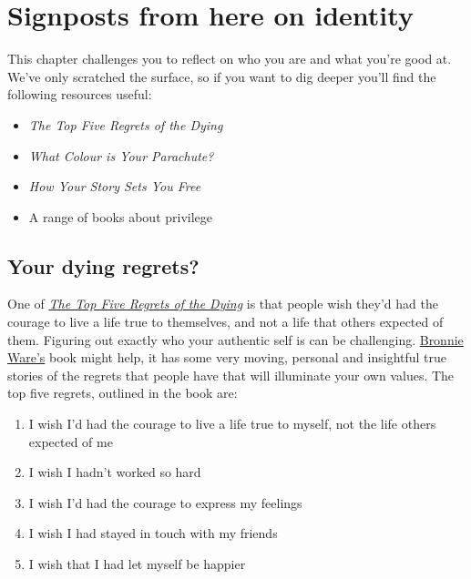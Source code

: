 \documentclass[
]{book}
\providecommand{\tightlist}{%
  \setlength{\itemsep}{0pt}\setlength{\parskip}{0pt}}
\begin{document}
\hypertarget{sign2}{%
\section{Signposts from here on identity}\label{sign2}}

This chapter challenges you to reflect on who you are and what you're good at. We've only scratched the surface, so if you want to dig deeper you'll find the following resources useful:

\begin{itemize}
\tightlist
\item
  \emph{The Top Five Regrets of the Dying}
\item
  \emph{What Colour is Your Parachute?}
\item
  \emph{How Your Story Sets You Free}
\item
  A range of books about privilege
\end{itemize}

\hypertarget{regret}{%
\subsection{Your dying regrets?}\label{regret}}

One of \emph{\href{https://en.wikipedia.org/wiki/The_Top_Five_Regrets_of_the_Dying}{The Top Five Regrets of the Dying}} \citep{regrets} is that people wish they'd had the courage to live a life true to themselves, and not a life that others expected of them. Figuring out exactly who your authentic self is can be challenging. \href{https://en.wikipedia.org/wiki/Bronnie_Ware}{Bronnie Ware's} book might help, it has some very moving, personal and insightful true stories of the regrets that people have that will illuminate your own values. The top five regrets, outlined in the book are:

\begin{enumerate}
\def\labelenumi{\arabic{enumi}.}
\tightlist
\item
  I wish I'd had the courage to live a life true to myself, not the life others expected of me
\item
  I wish I hadn't worked so hard
\item
  I wish I'd had the courage to express my feelings
\item
  I wish I had stayed in touch with my friends
\item
  I wish that I had let myself be happier
\end{enumerate}
\end{document}
